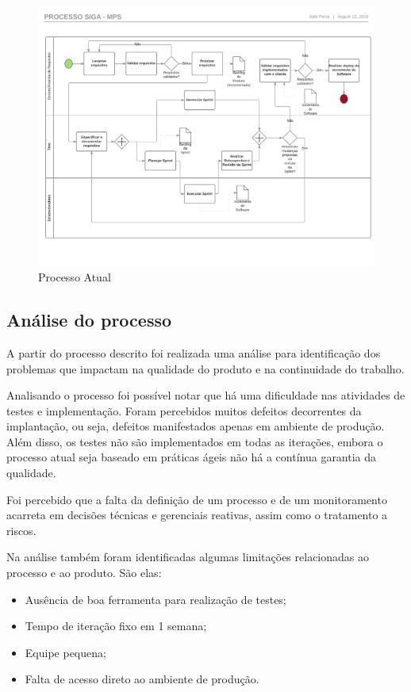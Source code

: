 \begin{figure}[!ht]
\centering
\includegraphics[scale=0.5]{figuras/processo_atual.png}
\caption{Processo Atual}
\label{fig:processo_atual}
\end{figure}


\subsection{Análise do processo}

A partir do processo descrito foi realizada uma análise para identificação dos problemas que impactam na qualidade do produto 
e na continuidade do trabalho. 

Analisando o processo foi possível notar que há uma dificuldade nas atividades de testes e implementação. Foram percebidos
muitos defeitos decorrentes da implantação, ou seja, defeitos manifestados apenas em ambiente de produção. Além disso, 
os testes não são implementados em todas as iterações, embora o processo atual seja baseado em práticas ágeis não há a 
contínua garantia da qualidade.

Foi percebido que a falta da definição de um processo e de um monitoramento acarreta em 
decisões técnicas e gerenciais reativas, assim como o tratamento a riscos. 

Na análise também foram identificadas algumas limitações relacionadas ao processo e ao produto. São elas: 

\begin{itemize}
  \item Ausência de boa ferramenta para realização de testes;
  \item Tempo de iteração fixo em 1 semana;
  \item Equipe pequena;
  \item Falta de acesso direto ao ambiente de produção.
\end{itemize}

